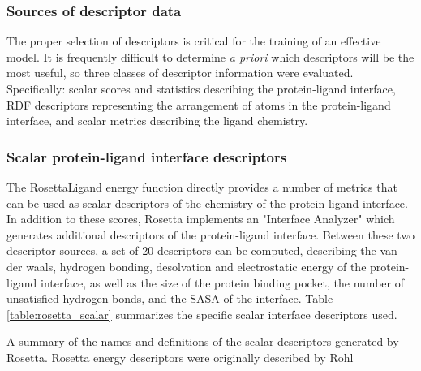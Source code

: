 \subsubsection{Sources of descriptor data} 

The proper selection of descriptors is critical for the training of an effective model.
It is frequently difficult to determine \textit{a priori} which descriptors will be the most useful, so three classes of descriptor information were evaluated.  Specifically: scalar scores and statistics describing the protein-ligand interface,  \ac{RDF} descriptors representing the arrangement of atoms in the protein-ligand interface, and scalar metrics describing the ligand chemistry.

\subsubsection{Scalar protein-ligand interface descriptors}
\label{subsubsec:scalar_rosetta}
The RosettaLigand energy function directly provides a number of metrics that can be used as scalar descriptors of the chemistry of the protein-ligand interface.
In addition to these scores, Rosetta implements an "Interface Analyzer" which generates additional descriptors of the protein-ligand interface.
Between these two descriptor sources, a set of 20 descriptors can be computed, describing the van der waals, hydrogen bonding, desolvation and electrostatic energy of the protein-ligand interface, as well as the size of the protein binding pocket, the number of unsatisfied hydrogen bonds, and the \ac{SASA} of the interface.
Table \ref{table:rosetta_scalar} summarizes the specific scalar interface descriptors used.
\begin{table}
\scriptsize
\renewcommand{\tabcolsep}{0.09cm}
\centering

\caption{A summary of the names and definitions of the scalar descriptors generated by Rosetta.
Rosetta energy descriptors were originally described by Rohl \citep{Rohl:2004dh} }
\label{table:rosetta_scalar}
\end{table}

